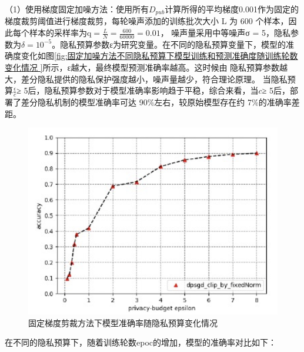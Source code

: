 （1）使用梯度固定加噪方法：使用所有$D_{p u b}$计算所得的平均梯度0.001作为固定的梯度裁剪阈值进行梯度裁剪，每轮噪声添加的训练批次大小 L 为 600 个样本，因此每个样本的采样率为$\mathrm{q}=\frac{L}{N}=\frac{600}{60000}=0.01$，
噪声量采用中等噪声σ = 5，隐私参数为$\delta=10^{-5}$。隐私预算参数ε为研究变量。在不同的隐私预算变量下，模型的准确度变化如图\ref{fig:固定加噪方法不同隐私预算下模型训练和预测准确度随训练轮数变化情况 
}所示，ε越大，最终模型预测准确率越高。这时候由
隐私预算参数越大，差分隐私提供的隐私保护强度越小，噪声量越少，符合理论原理。  当隐私预算$\frac{\epsilon}{c}$≥ 5后，隐私预算参数对于模型准确率影响趋于平稳，综合来看，当$c$≥ 5后，部署了差分隐私机制的模型准确率可达 90$\%$左右，较原始模型存在约 7$\%$的准确率差距。
\begin{figure}[!hbt]
\centering
  	\includegraphics[scale=0.6]{fig2/C5/梯度剪裁}%
	\caption{固定梯度剪裁方法下模型准确率随隐私预算变化情况}
  	\label{fig:固定梯度剪裁方法下模型准确率随隐私预算变化情况} 
\end{figure}

在不同的隐私预算下，随着训练轮数epoc的增加，模型的准确率对比如下： 

